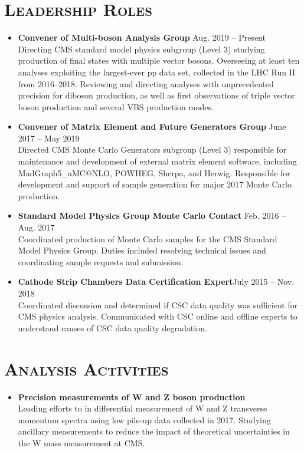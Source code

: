 \documentclass[10pt]{res} %
\begin{document}
\begin{resume}
\section{\textsc{Leadership Roles}}
\begin{itemize}
    \item{\textbf{Convener of Multi-boson Analysis Group} \hfill{Aug. 2019 -- Present}} \\
        Directing CMS standard model physics subgroup (Level 3) studying production of final states
    with multiple vector bosons. Overseeing at least ten analyses exploiting the largest-ever
    pp data set, collected in the LHC Run II from 2016--2018. Reviewing and directing
    analyses with unprecedented precision for diboson production, 
    as well as first observations of triple vector boson production and several VBS production modes.
\item{\textbf{Convener of Matrix Element and Future Generators Group} \hfill{June 2017 -- May 2019}}\\
    Directed CMS Monte Carlo Generators subgroup (Level 3)
    responsible for maintenance and development of external matrix element software, 
    including MadGraph5\_aMC@NLO, POWHEG, Sherpa, and Herwig. Responsible for development and support of sample generation for
    major 2017 Monte Carlo production.
\item{\textbf{Standard Model Physics Group Monte Carlo Contact} \hfill{Feb. 2016 -- Aug. 2017}} \\
    Coordinated
    production of Monte Carlo samples for the CMS Standard Model Physics Group. 
    Duties included resolving technical issues and coordinating sample requests and submission.
\item{\textbf{Cathode Strip Chambers Data Certification Expert}\hfill{July 2015 -- Nov. 2018}} \\
    Coordinated discussion and determined if
    CSC data quality was sufficient for CMS physics analysis.
    Communicated with CSC online and offline experts to understand
    causes of CSC data quality degradation.
\end{itemize}

\section{\textsc{Analysis Activities}}
\begin{itemize}
  \item\textbf{{Precision measurements of W and Z boson production}} \\
    Leading efforts to in differential
    measurement of W and Z transverse momentum spectra using low pile-up data
    collected in 2017. Studying ancillary measurements
    to reduce the impact of theoretical uncertainties in the W mass measurement at CMS.
    

\end{itemize}
\end{resume}
\end{document}
